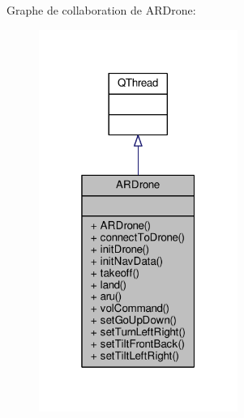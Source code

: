 Graphe de collaboration de A\-R\-Drone\-:
\nopagebreak
\begin{figure}[H]
\begin{center}
\leavevmode
\includegraphics[width=184pt]{class_a_r_drone__coll__graph}
\end{center}
\end{figure}
